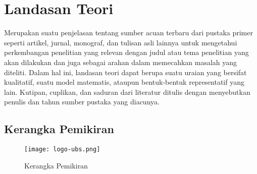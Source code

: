 \section{Landasan Teori}
\begin{sectioncontent}
    \hspace{\parindent}Merupakan suatu penjelasan tentang sumber acuan terbaru dari pustaka primer seperti artikel, jurnal, monograf, dan tulisan asli lainnya untuk mengetahui perkembangan penelitian yang relevan dengan judul atau tema penelitian yang akan dilakukan dan juga sebagai arahan dalam memecahkan masalah yang diteliti. Dalam hal ini, landasan teori dapat berupa suatu uraian yang bersifat kualitatif, suatu model matematis, ataupun bentuk-bentuk representatif yang lain. Kutipan, cuplikan, dan saduran dari literatur ditulis dengan menyebutkan penulis dan tahun sumber pustaka yang diacunya.
\end{sectioncontent}


\newpage %

\thispagestyle{empty}%
\begin{sidewaysfigure}

\section{Kerangka Pemikiran}
\begin{sectioncontent}
    \begin{figure}[H]
        \centering
        \texttt{[image: logo-ubs.png]} %
        \caption{Kerangka Pemikiran}
        \label{fig:logo-ubs} %
    \end{figure}
\end{sectioncontent}

\end{sidewaysfigure}

